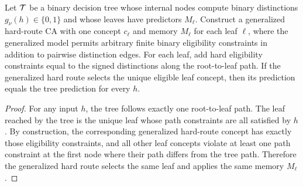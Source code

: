 \begin{proposition}
\label{prop:tree-as-dgm:formal}
Let $\mathcal{T}$ be a binary decision tree whose internal nodes compute binary distinctions $g_\nu(h)\in\{0,1\}$ and whose leaves have predictors $M_\ell$. Construct a generalized hard-route CA with one concept $c_\ell$ and memory $M_\ell$ for each leaf $\ell$, where the generalized model permits arbitrary finite binary eligibility constraints in addition to pairwise distinction edges. For each leaf, add hard eligibility constraints equal to the signed distinctions along the root-to-leaf path. If the generalized hard route selects the unique eligible leaf concept, then its prediction equals the tree prediction for every $h$.
\end{proposition}
\begin{proof}
For any input $h$, the tree follows exactly one root-to-leaf path. The leaf reached by the tree is the unique leaf whose path constraints are all satisfied by $h$. By construction, the corresponding generalized hard-route concept has exactly those eligibility constraints, and all other leaf concepts violate at least one path constraint at the first node where their path differs from the tree path. Therefore the generalized hard route selects the same leaf and applies the same memory $M_\ell$.
\end{proof}

